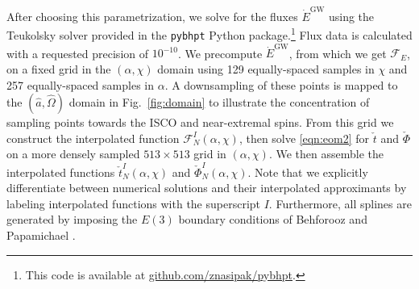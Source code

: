 \documentclass[%
 reprint,
 nofootinbib,
 amsmath,amssymb,
 aps,
 prd,
]{revtex4-2}
\begin{document}
After choosing this parametrization, we solve for the fluxes $\dot{E}^\mathrm{GW}$ using the Teukolsky solver provided in the \texttt{pybhpt} Python package.\footnote{This code is available at \href{https://github.com/znasipak/pybhpt}{github.com/znasipak/pybhpt}.} Flux data is calculated with a requested precision of $10^{-10}$. We precompute $\dot{E}^\mathrm{GW}$, from which we get $\mathcal{F}_E$, on a fixed grid in the $(\alpha, \chi)$ domain using 129 equally-spaced samples in $\chi$ and 257 equally-spaced samples in $\alpha$. A downsampling of these points is mapped to the $(\hat{a}, \hat{\Omega})$ domain in Fig.~\ref{fig:domain} to illustrate the concentration of sampling points towards the ISCO and near-extremal spins. From this grid we construct the interpolated function $\mathcal{F}_N^I(\alpha, \chi)$, then solve \eqref{eqn:eom2} for $\check{t}$ and $\check{\Phi}$ on a more densely sampled $513 \times 513$ grid in $(\alpha, \chi)$. We then assemble the interpolated functions $\check{t}^I_{N}(\alpha, \chi)$ and $\check{\Phi}^I_{N}(\alpha, \chi)$. Note that we explicitly differentiate between numerical solutions and their interpolated approximants by labeling interpolated functions with the superscript $I$. Furthermore, all splines are generated by imposing the $E(3)$ boundary conditions of Behforooz and Papamichael \cite{BehfPapa79, Behf95}. 
\end{document}
